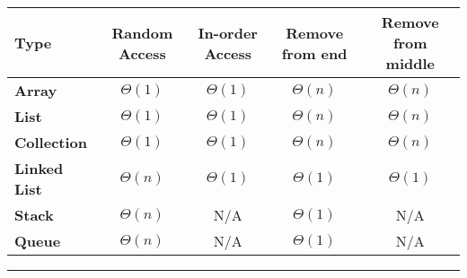 \documentclass{article}
\providecommand{\tabularnewline}{\\}
\begin{document}
\begin{center}
{\small{}\bigskip{}
}{\small\par}
\par\end{center}

\begin{center}
{\small{}}%
\begin{tabular}{|l|c|c|c|c|}
\hline 
\textbf{\small{}Type} & \textbf{\small{}Random Access} & \textbf{\small{}In-order Access} & \textbf{\small{}Remove from end} & \textbf{\small{}Remove from middle}\tabularnewline
\hline 
\hline 
\textbf{\small{}Array} & {\small{}$\Theta(1)$} & {\small{}$\Theta(1)$} & {\small{}$\Theta(n)$} & {\small{}$\Theta(n)$}\tabularnewline
\hline 
\textbf{\small{}List} & {\small{}$\Theta(1)$} & {\small{}$\Theta(1)$} & {\small{}$\Theta(n)$} & {\small{}$\Theta(n)$}\tabularnewline
\hline 
\textbf{\small{}Collection} & {\small{}$\Theta(1)$} & {\small{}$\Theta(1)$} & {\small{}$\Theta(n)$} & {\small{}$\Theta(n)$}\tabularnewline
\hline 
\textbf{\small{}Linked List} & {\small{}$\Theta(n)$} & {\small{}$\Theta(1)$} & {\small{}$\Theta(1)$} & {\small{}$\Theta(1)$}\tabularnewline
\hline 
\textbf{\small{}Stack} & {\small{}$\Theta(n)$} & {\small{}N/A } & {\small{}$\Theta(1)$} & {\small{}N/A}\tabularnewline
\hline 
\textbf{\small{}Queue} & {\small{}$\Theta(n)$} & {\small{}N/A } & {\small{}$\Theta(1)$} & {\small{}N/A}\tabularnewline
\hline 
\end{tabular}{\small\par}
\par\end{center}

\rule[0.5ex]{1\columnwidth}{1pt}
\end{document}
